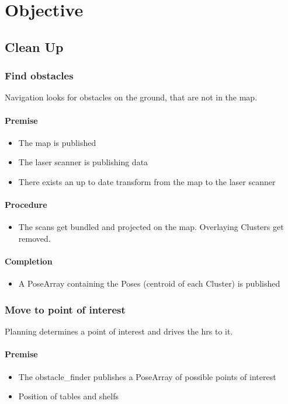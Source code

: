 \documentclass[main.tex]{subfiles}
\begin{document}
	
	\chapter{Objective}
	\section{Clean Up}
	
	\subsection{Find obstacles}
	Navigation looks for obstacles on the ground, that are not in the map.
	
	\subsubsection{Premise}
	\begin{itemize}
		\item The map is published
		\item The laser scanner is publishing data
		\item There exists an up to date transform from the map to the laser scanner
	\end{itemize} 
	
	\subsubsection{Procedure}
	\begin{itemize}			
		\item The scans get bundled and projected on the map. Overlaying Clusters get removed.
	\end{itemize}
	
	\subsubsection{Completion}
	\begin{itemize}
		\item A PoseArray containing the Poses (centroid of each Cluster) is published		
	\end{itemize}
	
	\subsection{Move to point of interest}
	Planning determines a point of interest and drives the hrs to it.
	
	\subsubsection{Premise}
		\begin{itemize}
			\item The obstacle\_finder publishes a PoseArray of possible points of interest
			\item Position of tables and shelfs 
		\end{itemize} 
		
\end{document}
